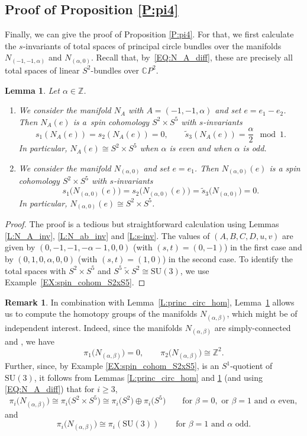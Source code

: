 \documentclass[pdftex]{sigma}
\numberwithin{equation}{section}
\newtheorem{Lemma}[Theorem]{Lemma}
\theoremstyle{definition}
\newtheorem{Remark}[Theorem]{Remark}
\numberwithin{table}{section}
\newcommand{\Z}{\mathbb{Z}}
\newcommand{\C}{\mathbb{C}}
\newcommand{\ttimes}{\mathrel{\widetilde{\times} }}
\begin{document}
\subsection{Proof of Proposition \ref{P:pi4}}\label{SS:pi4}

Finally, we can give the proof of Proposition \ref{P:pi4}. For that, we first calculate the $s$-invariants of total spaces of principal circle bundles over the manifolds $N_{(-1,-1,\alpha)}$ and $N_{(\alpha,0)}$. Recall that, by~\eqref{EQ:N_A_diff}, these are precisely all total spaces of linear $S^2$-bundles over $\C P^2$.
\begin{Lemma}\label{L:s_inv_S2-bdls}
	Let $\alpha\in\Z$.
	\begin{enumerate}\itemsep=0pt
		\item[$(1)$] We consider the manifold $N_{A}$ with $A=(-1,-1,\alpha)$ and set $e=e_1-e_2$. Then $N_{A}(e)$ is a~spin cohomology $S^2\times S^5$ with $s$-invariants
		\[ s_1(N_A(e))=s_2(N_A(e))=0,\qquad \tilde{s}_3(N_A(e))=\frac{\alpha}{2}\mod 1. \]
		In particular, $N_A(e)\cong S^2\times S^5$ when $\alpha$ is even and \smash{$N_A(e)\cong S^5\ttimes S^2$} when $\alpha$ is odd.
		\item[$(2)$] We consider the manifold $N_{(\alpha,0)}$ and set $e=e_1$. Then $N_{(\alpha,0)}(e)$ is a spin cohomology $S^2\times S^5$ with $s$-invariants
		\[ s_1\bigl(N_{(\alpha,0)}(e)\bigr)=s_2\bigl(N_{(\alpha,0)}(e)\bigr)=\tilde{s}_3\bigl(N_{(\alpha,0)}\bigr)=0. \]
		In particular, $N_{(\alpha,0)}(e)\cong S^2\times S^5$.
	\end{enumerate}
\end{Lemma}
\begin{proof}
	The proof is a tedious but straightforward calculation using Lemmas \ref{L:N_A_inv}, \ref{L:N_ab_inv} and \ref{L:s-inv}. The values of $(A,B,C,D,u,v)$ are given by $(0,-1,-1,-\alpha-1,0,0)$ (with $(s,t)=(0,-1)$) in the first case and by $(0,1,0,\alpha,0,0)$ (with $(s,t)=(1,0)$) in the second case. To identify the total spaces with $S^2\times S^5$ and $S^5\ttimes S^2\cong\mathrm{SU}(3)$, we use Example~\ref{EX:spin_cohom_S2xS5}.
\end{proof}

\begin{Remark}
	In combination with Lemma~\ref{L:princ_circ_hom}, Lemma~\ref{L:s_inv_S2-bdls} allows us to compute the homotopy groups of the manifolds $N_{(\alpha,\beta)}$, which might be of independent interest. Indeed, since the manifolds $N_{(\alpha,\beta)}$ are simply-connected and \smash{$H_2\bigl(N_{(\alpha,\beta)}\bigr)\cong\Z^2$}, we have
	\[ \pi_1\bigl(N_{(\alpha,\beta)}\bigr)=0,\qquad\pi_2\bigl(N_{(\alpha,\beta)}\bigr)\cong\Z^2. \]
	Further, since, by Example \ref{EX:spin_cohom_S2xS5}, \smash{$S^5\ttimes S^2$} is an $S^1$-quotient of $\mathrm{SU}(3)$, it follows from Lemmas \ref{L:princ_circ_hom} and \ref{L:s_inv_S2-bdls} (and using \eqref{EQ:N_A_diff}) that for $i\geq3$,
	\[ \pi_i\bigl(N_{(\alpha,\beta)}\bigr)\cong \pi_i\bigl(S^2\times S^5\bigr)\cong\pi_i\bigl(S^2\bigr)\oplus\pi_i\bigl(S^5\bigr)\qquad \text{for }\beta=0,\text{ or }\beta=1\text{ and }\alpha\text{ even}, \]
	and
	\[ \pi_i\bigl(N_{(\alpha,\beta)}\bigr)\cong \pi_i(\mathrm{SU}(3))\qquad \text{for }\beta=1\text{ and }\alpha\text{ odd}. \]
\end{Remark}
\end{document}
